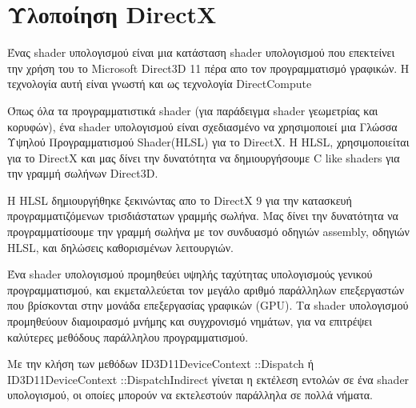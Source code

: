 \section{Υλοποίηση DirectX}
Ένας shader υπολογισμού είναι μια κατάσταση shader υπολογισμού που επεκτείνει την χρήση του το Microsoft Direct3D 11 πέρα απο τον προγραμματισμό γραφικών. Η τεχνολογία αυτή είναι γνωστή και ως τεχνολογία DirectCompute\cite{computeshaders-2}

Όπως όλα τα προγραμματιστικά shader (για παράδειγμα shader γεωμετρίας και κορυφών), ένα shader υπολογισμού είναι σχεδιασμένο να χρησιμοποιεί μια Γλώσσα Υψηλού Προγραμματισμού Shader(HLSL) για το DirectX. Η HLSL, χρησιμοποιείται για το DirectX και μας δίνει την δυνατότητα να δημιουργήσουμε C like shaders για την γραμμή σωλήνων Direct3D. 

Η HLSL δημιουργήθηκε ξεκινώντας απο το DirectX 9 για την κατασκευή προγραμματιζόμενων τρισδιάστατων γραμμής σωλήνα. Μας δίνει την δυνατότητα να προγραμματίσουμε την γραμμή σωλήνα με τον συνδυασμό οδηγιών assembly, οδηγιών HLSL, και δηλώσεις καθορισμένων λειτουργιών.

Ένα shader υπολογισμού προμηθεύει υψηλής ταχύτητας υπολογισμούς γενικού προγραμματισμού, και εκμεταλλεύεται τον μεγάλο αριθμό παράλληλων επεξεργαστών που βρίσκονται στην μονάδα επεξεργασίας γραφικών (GPU). Τα shader υπολογισμού προμηθεύουν διαμοιρασμό μνήμης και συγχρονισμό νημάτων, για να επιτρέψει καλύτερες μεθόδους παράλληλου προγραμματισμού. 

Με την κλήση των μεθόδων ID3D11DeviceContext ::Dispatch ή ID3D11DeviceContext ::DispatchIndirect γίνεται η εκτέλεση εντολών σε ένα shader υπολογισμού, οι οποίες μπορούν να εκτελεστούν παράλληλα σε πολλά νήματα.